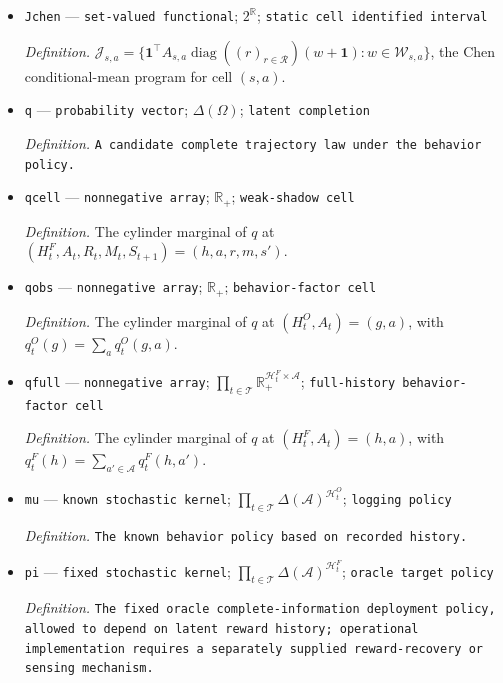 \documentclass{article}
\begin{document}
\begin{itemize}
  \item \texttt{Jchen} --- \texttt{set-\allowbreak{}valued functional}; \(2^{\mathbb R}\); \texttt{static cell identified interval}
  \par\smallskip\noindent\emph{Definition.} \(\mathcal J_{s,a}=\{\mathbf 1^\top A_{s,a}\operatorname{diag}((r)_{r\in\mathcal R})(w+\mathbf 1):w\in\mathcal W_{s,a}\}\), the Chen conditional-mean program for cell \((s,a)\).
  \item \texttt{q} --- \texttt{probability vector}; \(\Delta(\Omega)\); \texttt{latent completion}
  \par\smallskip\noindent\emph{Definition.} \texttt{A candidate complete trajectory law under the behavior policy.}
  \item \texttt{qcell} --- \texttt{nonnegative array}; \(\mathbb R_+\); \texttt{weak-\allowbreak{}shadow cell}
  \par\smallskip\noindent\emph{Definition.} The cylinder marginal of \(q\) at \((H_t^F,A_t,R_t,M_t,S_{t+1})=(h,a,r,m,s')\).
  \item \texttt{qobs} --- \texttt{nonnegative array}; \(\mathbb R_+\); \texttt{behavior-\allowbreak{}factor cell}
  \par\smallskip\noindent\emph{Definition.} The cylinder marginal of \(q\) at \((H_t^O,A_t)=(g,a)\), with \(q_t^O(g)=\sum_a q_t^O(g,a)\).
  \item \texttt{qfull} --- \texttt{nonnegative array}; \(\prod_{t\in\mathcal T}\mathbb R_+^{\mathcal H_t^F\times\mathcal A}\); \texttt{full-\allowbreak{}history behavior-\allowbreak{}factor cell}
  \par\smallskip\noindent\emph{Definition.} The cylinder marginal of \(q\) at \((H_t^F,A_t)=(h,a)\), with \(q_t^F(h)=\sum_{a'\in\mathcal A}q_t^F(h,a')\).
  \item \texttt{mu} --- \texttt{known stochastic kernel}; \(\prod_{t\in\mathcal T}\Delta(\mathcal A)^{\mathcal H_t^O}\); \texttt{logging policy}
  \par\smallskip\noindent\emph{Definition.} \texttt{The known behavior policy based on recorded history.}
  \item \texttt{pi} --- \texttt{fixed stochastic kernel}; \(\prod_{t\in\mathcal T}\Delta(\mathcal A)^{\mathcal H_t^F}\); \texttt{oracle target policy}
  \par\smallskip\noindent\emph{Definition.} \texttt{The fixed oracle complete-\allowbreak{}information deployment policy,\allowbreak{} allowed to depend on latent reward history;\allowbreak{} operational implementation requires a separately supplied reward-\allowbreak{}recovery or sensing mechanism.}

\end{itemize}
\end{document}
